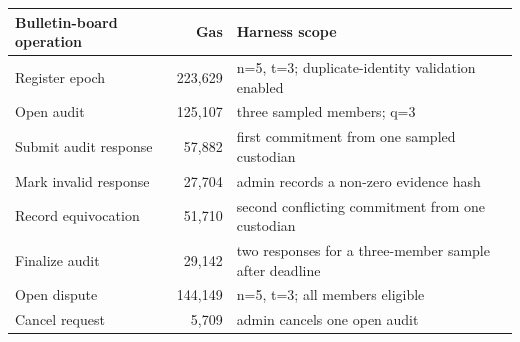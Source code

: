 \begin{tabularx}{\textwidth}{@{}l r X@{}}
\toprule
Bulletin-board operation & Gas & Harness scope\\
\midrule
Register epoch & 223,629 & n=5, t=3; duplicate-identity validation enabled\\
Open audit & 125,107 & three sampled members; q=3\\
Submit audit response & 57,882 & first commitment from one sampled custodian\\
Mark invalid response & 27,704 & admin records a non-zero evidence hash\\
Record equivocation & 51,710 & second conflicting commitment from one custodian\\
Finalize audit & 29,142 & two responses for a three-member sample after deadline\\
Open dispute & 144,149 & n=5, t=3; all members eligible\\
Cancel request & 5,709 & admin cancels one open audit\\
\bottomrule
\end{tabularx}

